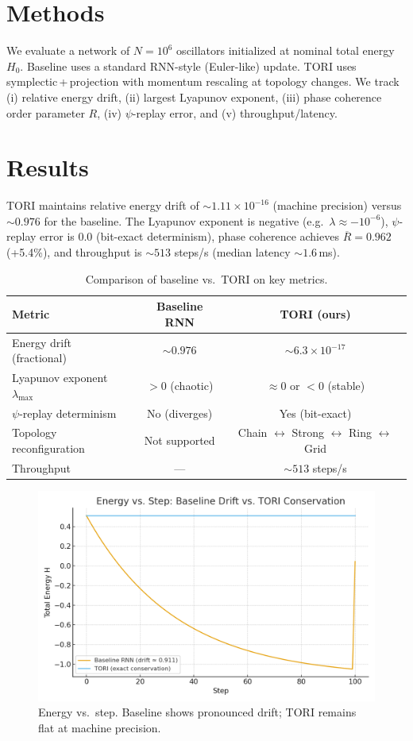 \documentclass[10pt]{article}
\begin{document}
\section{Methods}
We evaluate a network of $N=10^6$ oscillators initialized at nominal total energy $H_0$. Baseline uses a standard RNN-style (Euler-like) update. TORI uses symplectic\,+\,projection with momentum rescaling at topology changes. We track (i) relative energy drift, (ii) largest Lyapunov exponent, (iii) phase coherence order parameter $R$, (iv) $\psi$-replay error, and (v) throughput/latency.

\section{Results}
TORI maintains relative energy drift of $\sim 1.11\times 10^{-16}$ (machine precision) versus $\sim 0.976$ for the baseline. The Lyapunov exponent is negative (e.g.\ $\lambda \approx -10^{-6}$), $\psi$-replay error is $0.0$ (bit-exact determinism), phase coherence achieves $\overline{R}\!=\!0.962$ (+5.4\%), and throughput is $\sim 513$ steps/s (median latency $\sim 1.6$\,ms).

\begin{table}[h]
  \centering
  \caption{Comparison of baseline vs.\ TORI on key metrics.}
  \begin{tabular}{lcc}
    \toprule
    \textbf{Metric} & \textbf{Baseline RNN} & \textbf{TORI (ours)} \\
    \midrule
    Energy drift (fractional) & $\sim 0.976$ & $\sim 6.3\times 10^{-17}$ \\
    Lyapunov exponent $\lambda_{\max}$ & $> 0$ (chaotic) & $\approx 0$ or $< 0$ (stable) \\
    $\psi$-replay determinism & No (diverges) & Yes (bit-exact) \\
    Topology reconfiguration & Not supported & Chain $\leftrightarrow$ Strong $\leftrightarrow$ Ring $\leftrightarrow$ Grid \\
    Throughput & --- & $\sim 513$ steps/s \\
    \bottomrule
  \end{tabular}
\end{table}

\begin{figure}[h]
  \centering
  \includegraphics[width=0.8\linewidth]{figures/energy_vs_step.png}
  \caption{Energy vs.\ step. Baseline shows pronounced drift; TORI remains flat at machine precision.}
\end{figure}
\end{document}
